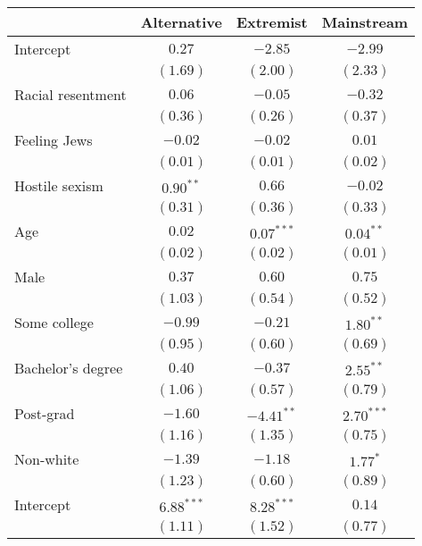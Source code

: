 
\usepackage{booktabs}

\begin{table}
\begin{center}
\begin{tabular}{l c c c}
\toprule
 & Alternative & Extremist & Mainstream \\
\midrule
Intercept         & $0.27$       & $-2.85$      & $-2.99$      \\
                  & $(1.69)$     & $(2.00)$     & $(2.33)$     \\
Racial resentment & $0.06$       & $-0.05$      & $-0.32$      \\
                  & $(0.36)$     & $(0.26)$     & $(0.37)$     \\
Feeling Jews      & $-0.02$      & $-0.02$      & $0.01$       \\
                  & $(0.01)$     & $(0.01)$     & $(0.02)$     \\
Hostile sexism    & $0.90^{**}$  & $0.66$       & $-0.02$      \\
                  & $(0.31)$     & $(0.36)$     & $(0.33)$     \\
Age               & $0.02$       & $0.07^{***}$ & $0.04^{**}$  \\
                  & $(0.02)$     & $(0.02)$     & $(0.01)$     \\
Male              & $0.37$       & $0.60$       & $0.75$       \\
                  & $(1.03)$     & $(0.54)$     & $(0.52)$     \\
Some college      & $-0.99$      & $-0.21$      & $1.80^{**}$  \\
                  & $(0.95)$     & $(0.60)$     & $(0.69)$     \\
Bachelor's degree & $0.40$       & $-0.37$      & $2.55^{**}$  \\
                  & $(1.06)$     & $(0.57)$     & $(0.79)$     \\
Post-grad         & $-1.60$      & $-4.41^{**}$ & $2.70^{***}$ \\
                  & $(1.16)$     & $(1.35)$     & $(0.75)$     \\
Non-white         & $-1.39$      & $-1.18$      & $1.77^{*}$   \\
                  & $(1.23)$     & $(0.60)$     & $(0.89)$     \\
Intercept         & $6.88^{***}$ & $8.28^{***}$ & $0.14$       \\
                  & $(1.11)$     & $(1.52)$     & $(0.77)$     \\

\end{tabular}
\end{center}
\end{table}
